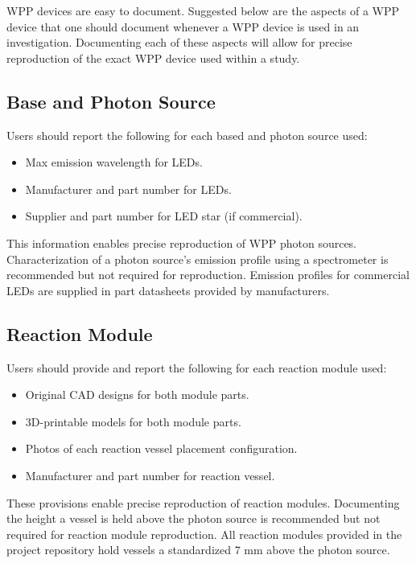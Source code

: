 \documentclass[11pt]{article}
\begin{document}
WPP devices are easy to document.
Suggested below are the aspects of a WPP device that one should document whenever a WPP device is used in an investigation. 
Documenting each of these aspects will allow for precise reproduction of the exact WPP device used within a study. 

\subsection{Base and Photon Source} \label{SEC:doc-photon-source}

Users should report the following for each based and photon source used:

\begin{itemize}
	\item Max emission wavelength for LEDs.
	\item Manufacturer and part number for LEDs.
	\item Supplier and part number for LED star (if commercial).
\end{itemize}

This information enables precise reproduction of WPP photon sources. Characterization of a photon source’s emission profile using a spectrometer is recommended but not required for reproduction. Emission profiles for commercial LEDs are supplied in part datasheets provided by manufacturers.

\subsection{Reaction Module} \label{SEC:doc-reaction modules}

Users should provide and report the following for each reaction module used:

\begin{itemize}
	\item Original CAD designs for both module parts.
	\item 3D-printable models for both module parts.
	\item Photos of each reaction vessel placement configuration.
	\item Manufacturer and part number for reaction vessel.
\end{itemize}

These provisions enable precise reproduction of reaction modules. Documenting the height a vessel is held above the photon source is recommended but not required for reaction module reproduction. All reaction modules provided in the project repository hold vessels a standardized 7 mm above the photon source.
\end{document}
